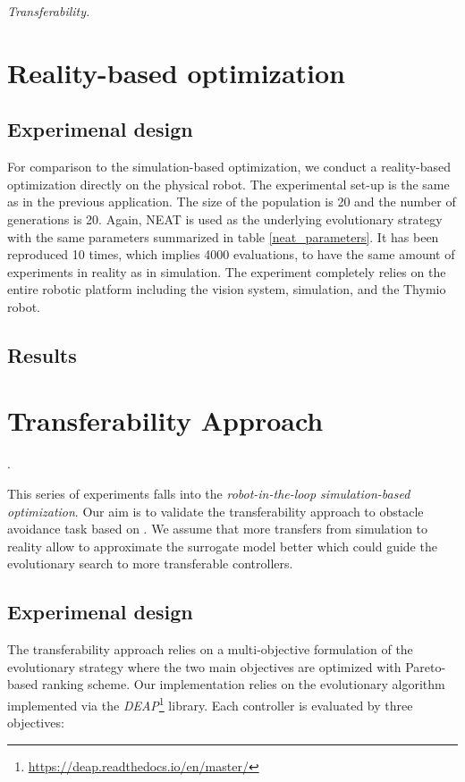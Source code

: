 \emph{Transferability.}

\section{Reality-based optimization}

\subsection{Experimenal design}

For comparison to the simulation-based optimization, we conduct a reality-based optimization directly on the physical robot. The experimental set-up is the same as in the previous application. The size of the population is 20 and the number of generations is 20. Again, NEAT is used as the underlying evolutionary strategy with the same parameters summarized in table \ref{neat_parameters}. It has been reproduced 10 times, which implies 4000 evaluations, to have the same amount of experiments in reality as in simulation. The experiment completely relies on the entire robotic platform including the vision system, simulation, and the Thymio robot.

\subsection{Results}

\section{Transferability Approach}.

This series of experiments falls into the \emph{robot-in-the-loop simulation-based optimization}. Our aim is to validate the transferability approach to obstacle avoidance task based on \citep{koos2012transferability}. We assume that more transfers from simulation to reality allow to approximate the surrogate model better which could guide the evolutionary search to more transferable controllers.

\subsection{Experimenal design}

The transferability approach relies on a multi-objective formulation of the evolutionary strategy where the two main objectives are optimized with Pareto-based ranking scheme. Our implementation relies on the \citep{deb200fast} evolutionary algorithm implemented via the \emph{DEAP}\footnote{\url{https://deap.readthedocs.io/en/master/}} library. Each controller is evaluated by three objectives:

